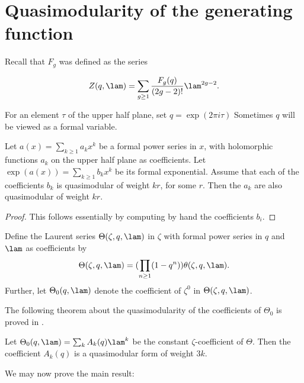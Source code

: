 \section{Quasimodularity of the generating function}

Recall that $F_g$ was defined as the series

 \[Z(q,\lam) = \sum_{g\geq 1}\frac{F_g(q)}{(2g-2)!}\lam^{2g-2}.\]
 
For an element $\tau$ of the upper half plane, set $q=\exp(2\pi i \tau)$ Sometimes $q$ will be viewed as a formal variable.

\begin{prop} \label{prop:exp-quasimodular}
 Let $a(x)=\sum_{k\geq 1} a_k x^k$ be a formal power series in $x$, with holomorphic functions $a_k$ on the upper half plane as coefficients. Let $\exp(a(x))=\sum_{k\geq 1} b_k x^k$ be its formal exponential. Assume that each of the coefficients $b_k$ is quasimodular of weight $kr$, for some $r$. Then the $a_k$ are also quasimodular of weight $kr$.
\end{prop}
\begin{proof}
 This follows essentially by computing by hand the coefficients $b_i$.
\end{proof}

\begin{defi}
 Define the Laurent series $\Theta(\zeta,q,\lam)$ in $\zeta$ with formal power series in $q$ and $\lam$ as coefficients by
 \[
  \Theta(\zeta,q,\lam)=(\prod_{n\geq 1}(1-q^n))\theta(\zeta,q,\lam).
 \]
 Further, let $\Theta_0(q,\lam)$ denote the coefficient of $\zeta^0$ in $\Theta(\zeta,q,\lam)$.
\end{defi}

The following theorem about the quasimodularity of the coefficients of $\Theta_0$ is proved in \cite{Kaneko-Zagier1995}.

\begin{thm}
 Let $\Theta_0(q,\lam)=\sum_{k}A_k(q)\lam^k$ be the constant $\zeta$-coefficient of $\Theta$. Then the coefficient $A_k(q)$ is a quasimodular form of weight $3k$.
\end{thm}

We may now prove the main result:

